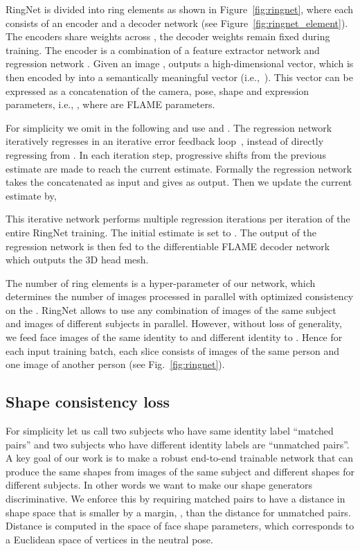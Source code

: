 RingNet is divided into  ring elements  as shown in Figure~\ref{fig:ringnet}, where each  consists of an encoder and a decoder network (see Figure~\ref{fig:ringnet_element}). The encoders share weights across , the decoder weights remain fixed during training. The encoder is a combination of a feature extractor network  and regression network . Given an image ,  outputs a high-dimensional vector, which is then encoded by  into a semantically meaningful vector 
(i.e.,~). This vector can be expressed as a concatenation of the camera, pose, shape and expression parameters, i.e., , where  are FLAME parameters. 

For simplicity we omit  in the following and use  and . The regression network iteratively regresses  in an iterative error feedback loop~\cite{kanazawaHMR18, Carreira1}, instead of directly regressing  from . In each iteration step, progressive shifts from the previous estimate are made to reach the current estimate. Formally the regression network takes the concatenated  as input and gives  as output. Then we update the current estimate by,

This iterative network performs multiple regression iterations per iteration of the entire RingNet training. The initial estimate is set to . The output of the regression network is then fed to the differentiable FLAME decoder network which outputs the 3D head mesh.

The number of ring elements  is a hyper-parameter of our network, which determines the number of images processed in parallel with optimized consistency on the . RingNet allows to use any combination of images of the same subject and images of different subjects in parallel. However, without loss of generality, we feed face images of the same identity to  and different identity to . Hence for each input training batch, each slice consists of  images of the same person and one image of another person (see Fig.~\ref{fig:ringnet}). 



\subsection{Shape consistency loss}

For simplicity let us call two subjects who have same identity label  ``matched pairs'' and two subjects who have different identity labels are ``unmatched pairs''.
A key goal of our work is to make a robust end-to-end trainable network that can produce the same shapes from images of the same subject and different shapes for different subjects.
In other words we want to make our shape generators discriminative. 
We enforce this by requiring matched pairs to have a distance in shape space that is smaller by a margin, , than the distance for unmatched pairs.
Distance is computed in the space of face shape parameters, which corresponds to a Euclidean space of vertices in the neutral pose.

